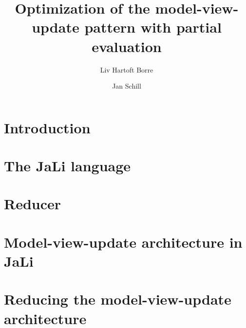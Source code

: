 \documentclass[runningheads]{llncs}
\begin{document}
\title{%
  Optimization of the model-view-update\break%
  pattern with partial evaluation\break%
}

\author{Liv Hartoft Borre 
\and Jan Schill
}



\maketitle

\begin{abstract}
    
\end{abstract}

\newcommand{\jan}[1]{\par\smallskip\noindent{\small\llap{\textbf{{jan:}~~}}{\textsf{#1}}}\par\smallskip}
\newcommand{\liv}[1]{\par\smallskip\noindent{\small\llap{\textsf{{liv:}~~}}{\textsl{#1}}}\par\smallskip}
\setcounter{secnumdepth}{-1}
\section{Introduction}\label{introduction}

\newpage
\setcounter{secnumdepth}{2}
\section{The JaLi language} \label{jali}

\newpage

\section{Reducer}\label{reducer}

\newpage

\section{Model-view-update architecture in JaLi} \label{Model-view-update-architecture-in-JaLi}

\newpage

\section{Reducing the model-view-update architecture}\label{reducing-mvu}

\newpage
\end{document}
